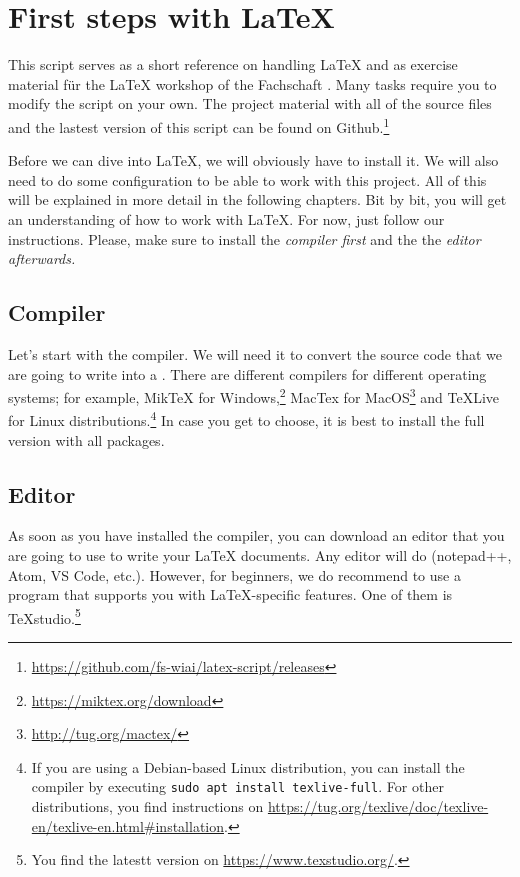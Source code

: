 \newpage
{}
\pagecolor{latexblue}

\chapter*{First steps with \LaTeX}

This script serves as a short reference on handling \LaTeX{} and as exercise material für the \LaTeX{} workshop of the Fachschaft .
Many tasks require you to modify the script on your own.
The project material with all of the source files and the lastest version of this script can be found on Github.\footnote{\url{https://github.com/fs-wiai/latex-script/releases}}

Before we can dive into \LaTeX{}, we will obviously have to install it.
We will also need to do some configuration to be able to work with this project.
All of this will be explained in more detail in the following chapters.
Bit by bit, you will get an understanding of how to work with \LaTeX{}.
For now, just follow our instructions.
Please, make sure to install the \emph{compiler first} and the the \emph{editor afterwards}\textit{.}

\section*{Compiler}
Let’s start with the compiler.
We will need it to convert the source code that we are going to write into a .
There are different compilers for different operating systems;
for example, MikTeX for Windows,\footnote{\url{https://miktex.org/download}} MacTex for MacOS\footnote{\url{http://tug.org/mactex/}} and TeXLive for Linux distributions.\footnote{If you are using a Debian-based Linux distribution, you can install the compiler by executing \texttt{sudo apt install texlive-full}. For other distributions, you find instructions on \url{https://tug.org/texlive/doc/texlive-en/texlive-en.html\#installation}.} In case you get to choose, it is best to install the full version with all packages.

\section*{Editor}
As soon as you have installed the compiler, you can download an editor that you are going to use to write your \LaTeX{} documents.
Any editor will do (notepad++, Atom, VS Code, etc.).
However, for beginners, we do recommend to use a program that supports you with \LaTeX-specific features.
One of them is TeXstudio.\footnote{You find the latestt version on \url{https://www.texstudio.org/}.}

